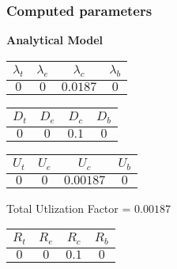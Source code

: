 \documentclass{article}
\begin{document}
\subsubsection{Computed parameters}
\begin{minipage}{0.5\textwidth}
\centering	\textbf{Analytical Model}
\begin{table}[H]
\centering
\begin{tabular}{@{}cccc@{}}
\toprule
$\lambda_t$ & $\lambda_e$ & $\lambda_c$ & $\lambda_b$\\
\midrule
$0$ & $0$ & $0.0187$ & $0$\\
\bottomrule
\end{tabular}
\end{table}\begin{table}[H]
\centering
\begin{tabular}{@{}cccc@{}}
\toprule
$D_t$ & $D_e$ & $D_c$ & $D_b$\\
\midrule
$0$ & $0$ & $0.1$ & $0$\\
\bottomrule
\end{tabular}
\end{table}\begin{table}[H]
\centering
\begin{tabular}{@{}cccc@{}}
\toprule
$U_t$ & $U_e$ & $U_c$ & $U_b$\\
\midrule
$0$ & $0$ & $0.00187$ & $0$\\
\bottomrule
\end{tabular}
\end{table}
\centering Total Utlization Factor = $0.00187$
\begin{table}[H]
\centering
\begin{tabular}{@{}cccc@{}}
\toprule
$R_t$ & $R_e$ & $R_c$ & $R_b$\\
\midrule
$0$ & $0$ & $0.1$ & $0$\\
\bottomrule
\end{tabular}
\end{table}
\end{minipage}
\end{document}
